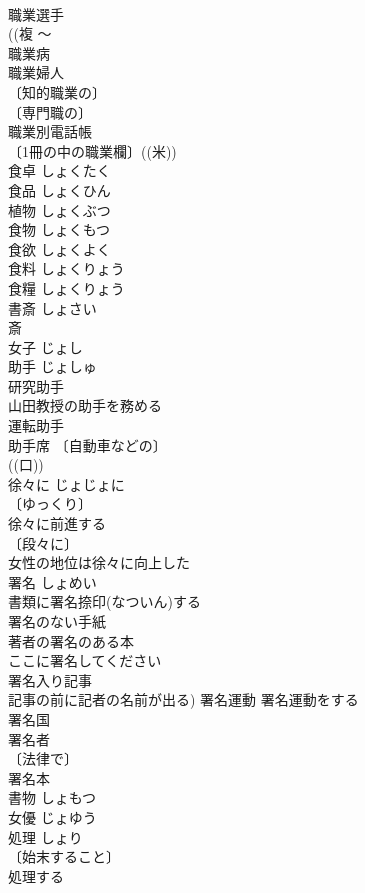 \documentclass[8pt]{extreport}
\begin{document}
\begin{CJK}{UTF8}{min}
\\	職業選手 
\\	((複 〜
\\	職業病 
\\	職業婦人 
\\	〔知的職業の〕
\\	〔専門職の〕
\\	職業別電話帳 
\\	〔1冊の中の職業欄〕((米)) 
\\	食卓	しょくたく	
\\	食品	しょくひん	
\\	植物	しょくぶつ	
\\	食物	しょくもつ	
\\	食欲	しょくよく	
\\	食料	しょくりょう	
\\	食糧	しょくりょう	
\\	書斎	しょさい	
\\	斎　
\\	女子	じょし	
\\	助手	じょしゅ	
\\	研究助手 
\\	山田教授の助手を務める 
\\	運転助手 
\\	助手席 〔自動車などの〕
\\	((口))
\\	徐々に	じょじょに	
\\	〔ゆっくり〕
\\	徐々に前進する 
\\	〔段々に〕
\\	女性の地位は徐々に向上した 
\\	署名	しょめい	
\\	書類に署名捺印(なついん)する 
\\	署名のない手紙 
\\	著者の署名のある本 
\\	ここに署名してください 
\\	署名入り記事 
\\	記事の前に記者の名前が出る) 署名運動 署名運動をする 
\\	署名国 
\\	署名者 
\\	〔法律で〕
\\	署名本 
\\	書物	しょもつ	
\\	女優	じょゆう	
\\	処理	しょり	
\\	〔始末すること〕
\\	処理する 

\end{CJK}
\end{document}
